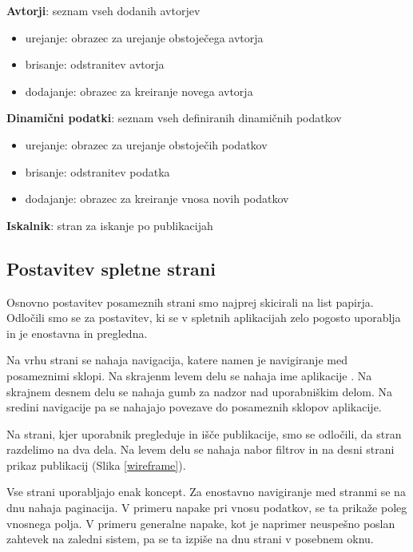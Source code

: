 \documentclass[a4paper, 12pt]{book}
\begin{document}
\begin{description}
		\item \textbf{Avtorji}: seznam vseh dodanih avtorjev
		\begin{itemize}
		    \item urejanje: obrazec za urejanje obstoječega avtorja
		    \item brisanje: odstranitev avtorja
		    \item dodajanje: obrazec za kreiranje novega avtorja
		\end{itemize}
		
		\item \textbf{Dinamični podatki}: seznam vseh definiranih dinamičnih podatkov
		\begin{itemize}
		    \item urejanje: obrazec za urejanje obstoječih podatkov
		    \item brisanje: odstranitev podatka
		    \item dodajanje: obrazec za kreiranje vnosa novih podatkov
		\end{itemize}
		
		\item \textbf{Iskalnik}: stran za iskanje po publikacijah
\end{description}

\subsection{Postavitev spletne strani}
Osnovno postavitev posameznih strani smo najprej skicirali na list papirja. Odločili smo se za postavitev, ki se v spletnih aplikacijah zelo pogosto uporablja in je enostavna in pregledna.

Na vrhu strani se nahaja navigacija, katere namen je navigiranje med posameznimi sklopi. Na skrajenm levem delu se nahaja ime aplikacije . Na skrajnem desnem delu se nahaja gumb za nadzor nad uporabniškim delom. Na sredini navigacije pa se nahajajo povezave do posameznih sklopov aplikacije.

Na strani, kjer uporabnik pregleduje in išče publikacije, smo se odločili, da stran razdelimo na dva dela. Na levem delu se nahaja nabor filtrov in na desni strani prikaz publikacij (Slika \ref{wireframe}). 

Vse strani uporabljajo enak koncept. Za enostavno navigiranje med stranmi se na dnu nahaja paginacija. V primeru napake pri vnosu podatkov, se ta prikaže poleg vnosnega polja. V primeru generalne napake, kot je naprimer neuspešno poslan zahtevek na zaledni sistem, pa se ta izpiše na dnu strani v posebnem oknu.
\end{document}
